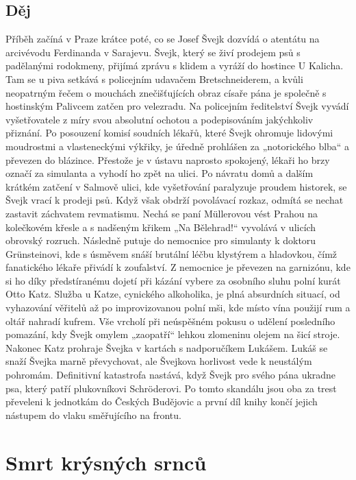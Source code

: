 \documentclass[12pt, a4paper]{article}
\begin{document}
{\color{subsectioncolor}\hrulefill}
\subsection*{\color{subsectioncolor}Děj}
Příběh začíná v Praze krátce poté, co se Josef Švejk dozvídá o atentátu na arcivévodu Ferdinanda v Sarajevu. Švejk, který se živí prodejem psů s padělanými rodokmeny, přijímá zprávu s klidem a vyráží do hostince U Kalicha. Tam se u piva setkává s policejním udavačem Bretschneiderem, a kvůli neopatrným řečem o mouchách znečišťujících obraz císaře pána je společně s hostinským Palivcem zatčen pro velezradu. Na policejním ředitelství Švejk vyvádí vyšetřovatele z míry svou absolutní ochotou a podepisováním jakýchkoliv přiznání. Po posouzení komisí soudních lékařů, které Švejk ohromuje lidovými moudrostmi a vlasteneckými výkřiky, je úředně prohlášen za „notorického blba“ a převezen do blázince. Přestože je v ústavu naprosto spokojený, lékaři ho brzy označí za simulanta a vyhodí ho zpět na ulici.  Po návratu domů a dalším krátkém zatčení v Salmově ulici, kde vyšetřování paralyzuje proudem historek, se Švejk vrací k prodeji psů. Když však obdrží povolávací rozkaz, odmítá se nechat zastavit záchvatem revmatismu. Nechá se paní Müllerovou vést Prahou na kolečkovém křesle a s nadšeným křikem „Na Bělehrad!“ vyvolává v ulicích obrovský rozruch. Následně putuje do nemocnice pro simulanty k doktoru Grünsteinovi, kde s úsměvem snáší brutální léčbu klystýrem a hladovkou, čímž fanatického lékaře přivádí k zoufalství. Z nemocnice je převezen na garnizónu, kde si ho díky předstíranému dojetí při kázání vybere za osobního sluhu polní kurát Otto Katz.  Služba u Katze, cynického alkoholika, je plná absurdních situací, od vyhazování věřitelů až po improvizovanou polní mši, kde místo vína použijí rum a oltář nahradí kufrem. Vše vrcholí při neúspěšném pokusu o udělení posledního pomazání, kdy Švejk omylem „zaopatří“ lehkou zlomeninu olejem na šicí stroje. Nakonec Katz prohraje Švejka v kartách s nadporučíkem Lukášem. Lukáš se snaží Švejka marně převychovat, ale Švejkova horlivost vede k neustálým pohromám. Definitivní katastrofa nastává, když Švejk pro svého pána ukradne psa, který patří plukovníkovi Schröderovi. Po tomto skandálu jsou oba za trest převeleni k jednotkám do Českých Budějovic a první díl knihy končí jejich nástupem do vlaku směřujícího na frontu.

\newpage

\section{Smrt krýsných srnců}
\end{document}
